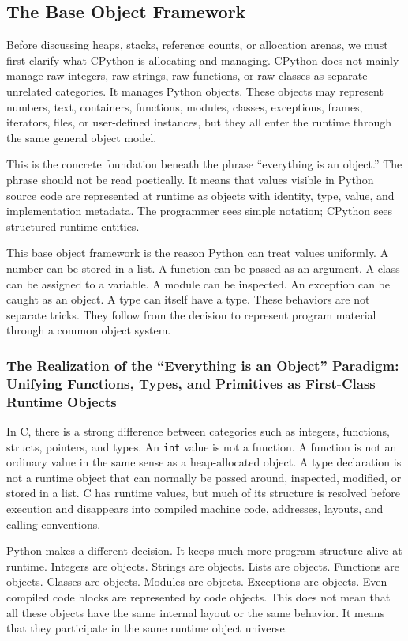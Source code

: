 \subsection{The Base Object Framework}

Before discussing heaps, stacks, reference counts, or allocation arenas, we must first clarify what CPython is allocating and managing. CPython does not mainly manage raw integers, raw strings, raw functions, or raw classes as separate unrelated categories. It manages Python objects. These objects may represent numbers, text, containers, functions, modules, classes, exceptions, frames, iterators, files, or user-defined instances, but they all enter the runtime through the same general object model.

This is the concrete foundation beneath the phrase ``everything is an object.'' The phrase should not be read poetically. It means that values visible in Python source code are represented at runtime as objects with identity, type, value, and implementation metadata. The programmer sees simple notation; CPython sees structured runtime entities.

This base object framework is the reason Python can treat values uniformly. A number can be stored in a list. A function can be passed as an argument. A class can be assigned to a variable. A module can be inspected. An exception can be caught as an object. A type can itself have a type. These behaviors are not separate tricks. They follow from the decision to represent program material through a common object system.

\subsubsection{The Realization of the ``Everything is an Object'' Paradigm: Unifying Functions, Types, and Primitives as First-Class Runtime Objects}

In C, there is a strong difference between categories such as integers, functions, structs, pointers, and types. An \texttt{int} value is not a function. A function is not an ordinary value in the same sense as a heap-allocated object. A type declaration is not a runtime object that can normally be passed around, inspected, modified, or stored in a list. C has runtime values, but much of its structure is resolved before execution and disappears into compiled machine code, addresses, layouts, and calling conventions.

Python makes a different decision. It keeps much more program structure alive at runtime. Integers are objects. Strings are objects. Lists are objects. Functions are objects. Classes are objects. Modules are objects. Exceptions are objects. Even compiled code blocks are represented by code objects. This does not mean that all these objects have the same internal layout or the same behavior. It means that they participate in the same runtime object universe.

